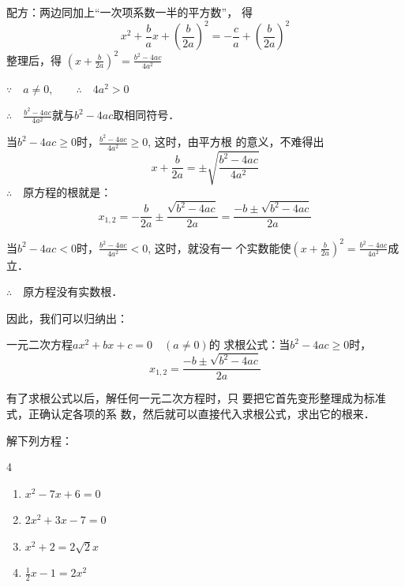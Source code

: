 配方：两边同加上“一次项系数一半的平方数”，
得
\[x^2+\frac{b}{a}x+\left(\frac{b}{2a}\right)^2=-\frac{c}{a}+\left(\frac{b}{2a}\right)^2\]
整理后，得 $\left(x+\frac{b}{2a}\right)^2=\frac{b^2-4ac}{4a^2}$

$\because\quad a\ne 0, \qquad \therefore\quad 4a^2>0$

$\therefore\quad \frac{b^2-4ac}{4a^2}$就与$b^2-4ac$取相同符号．

当$b^2-4ac\ge 0$时，$\frac{b^2-4ac}{4a^2}\ge 0$, 这时，由平方根
的意义，不难得出
\[x+\frac{b}{2a}=\pm\sqrt{\frac{b^2-4ac}{4a^2}}\]
$\therefore\quad $原方程的根就是：
\[x_{1,2}=-\frac{b}{2a}\pm \frac{\sqrt{b^2-4ac}}{2a}=\frac{-b\pm \sqrt{b^2-4ac}}{2a} \]

当$b^2-4ac<0$时，$\frac{b^2-4ac}{4a^2}<0$, 这时，就没有一
个实数能使$\left(x+\frac{b}{2a}\right)^2=\frac{b^2-4ac}{4a^2}$成立．

$\therefore\quad $原方程没有实数根．

因此，我们可以归纳出：
\begin{blk}{}
    一元二次方程$ax^2+bx+c=0\quad (a\ne 0)$的
    求根公式：当$b^2-4ac\ge 0$时，
\[x_{1,2}=\frac{-b\pm\sqrt{b^2-4ac}}{2a} \]
\end{blk}

有了求根公式以后，解任何一元二次方程时，只
要把它首先变形整理成为标准式，正确认定各项的系
数，然后就可以直接代入求根公式，求出它的根来．

\begin{example}
    解下列方程：
    \begin{multicols}{4}
\begin{enumerate}
    \item $x^2-7x+6=0$
    \item $2x^2+3x-7=0$
    \item $x^2+2=2\sqrt{2}x$
    \item $\frac{1}{2}x-1=2x^2$
\end{enumerate}
    \end{multicols}
\end{example}

